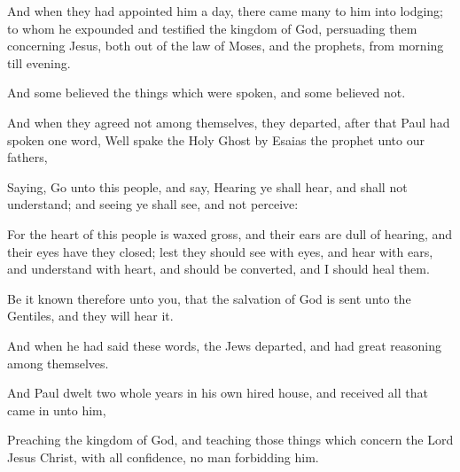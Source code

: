{And when they had
appointed
him a
day, there
came
many
to
him
into
{}
lodging; to
whom he
expounded
and
testified the
kingdom of
God,
persuading
them
concerning
Jesus,
both
out of the
law of
Moses,
and
{} the
prophets,
from
morning
till
evening.

And
some
believed the
things which were
spoken,
and
some believed
not.

And
when they agreed
not
among
themselves, they
departed, after that
Paul had
spoken
one
word,
Well
spake the
Holy
Ghost
by
Esaias the
prophet
unto
our
fathers,

Saying,
Go
unto
this
people,
and
say,
Hearing ye shall
hear,
and
shall
not
understand;
and
seeing ye shall
see,
and
not
perceive:

For the
heart of
this
people is waxed
gross,
and their
ears
are dull
of
hearing,
and
their
eyes have they
closed;
lest they should
see
with
{}
eyes,
and
hear
with
{}
ears,
and
understand
with
{}
heart,
and should be
converted,
and I should
heal
them.

Be
it
known
therefore unto
you,
that the
salvation of
God is
sent unto the
Gentiles,
and
{}
they will hear
it.

And when
he had
said these
words, the
Jews
departed, and
had
great
reasoning
among
themselves.


\par }{\PP {}And
Paul
dwelt
two
whole
years
in his
own hired
house,
and
received
all that came
in
unto
him,

Preaching the
kingdom of
God,
and
teaching those
things which
concern the
Lord
Jesus
Christ,
with
all
confidence, no man forbidding
him.


\par }